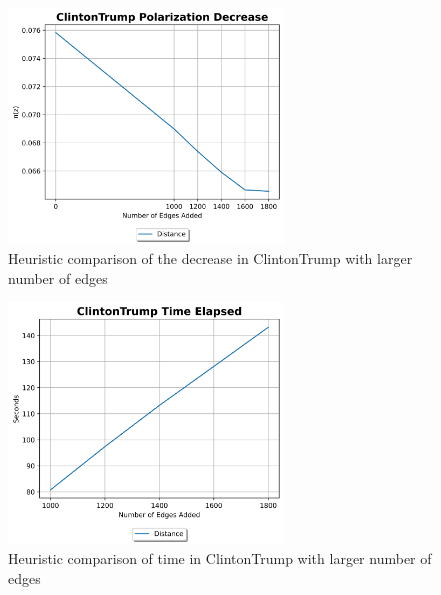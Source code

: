 \begin{table}[H]
\begin{figure}[H]
	\centering
	\includegraphics[width=0.65\textwidth]{Figures/ClintonTrump Polarization Decrease 2}
	\caption{Heuristic comparison of the decrease in ClintonTrump with larger number of edges}
	\label{fig:ClintonTrump_pol}
\end{figure}


\begin{figure}[H]
	\centering
	\includegraphics[width=0.65\textwidth]{Figures/ClintonTrump Time Elapsed 2}
	\caption{Heuristic comparison of time in ClintonTrump with larger number of edges}
	\label{fig:ClintonTrump_time}
\end{figure}
\clearpage



\end{table}
